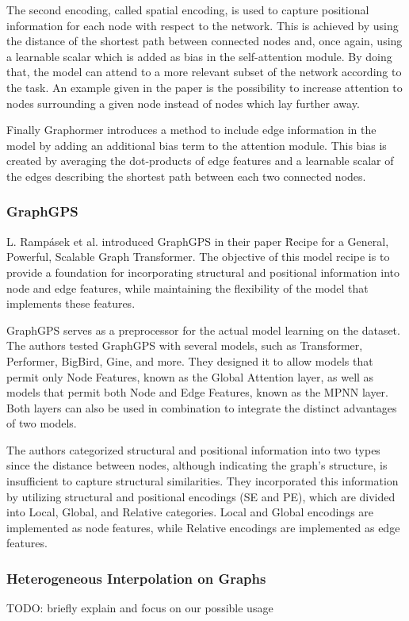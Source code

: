 The second encoding, called spatial encoding, is used to capture positional information for each node with respect to the network. This is achieved by using the distance of the shortest path between connected nodes and, once again, using a learnable scalar which is added as bias in the self-attention module. By doing that, the model can attend to a more relevant subset of the network according to the task. An example given in the paper is the possibility to increase attention to nodes surrounding a given node instead of nodes which lay further away.

Finally Graphormer introduces a method to include edge information in the model by adding an additional bias term to the attention module. This bias is created by averaging the dot-products of edge features and a learnable scalar of the edges describing the shortest path between each two connected nodes.  

\subsubsection{GraphGPS}
L. Rampásek et al. introduced GraphGPS in their paper \"Recipe for a General, Powerful, Scalable Graph Transformer. \" \cite{2023graphgps} The objective of this model recipe is to provide a foundation for incorporating structural and positional information into node and edge features, while maintaining the flexibility of the model that implements these features.

GraphGPS serves as a preprocessor for the actual model learning on the dataset. The authors tested GraphGPS with several models, such as Transformer, Performer, BigBird, Gine, and more. They designed it to allow models that permit only Node Features, known as the Global Attention layer, as well as models that permit both Node and Edge Features, known as the MPNN layer. Both layers can also be used in combination to integrate the distinct advantages of two models.

The authors categorized structural and positional information into two types since the distance between nodes, although indicating the graph's structure, is insufficient to capture structural similarities. They incorporated this information by utilizing structural and positional encodings (SE and PE), which are divided into Local, Global, and Relative categories. Local and Global encodings are implemented as node features, while Relative encodings are implemented as edge features.

\subsubsection{Heterogeneous Interpolation on Graphs}
TODO: briefly explain and focus on our possible usage
